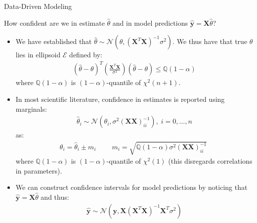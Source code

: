 \documentclass[handout,9pt]{beamer}
\begin{document}
%
\begin{frame}{Data-Driven Modeling}

\begin{block}{}
How confident are we in estimate $\hat{\theta}$ and in model predictions $\hat{\mathbf{y}}=\mathbf{X}\hat{\theta}$?
\end{block}
\begin{itemize}
\setlength{\itemsep}{5pt}
\item We have established that $\hat{\theta}\sim\mathcal{N}(\theta,(\mathbf{X}^T\mathbf{X})^{-1}\sigma^2)$.  We thus have that true $\theta$ lies in ellipsoid $\mathcal{E}$ defined by:
\begin{align*}
(\hat{\theta}-\theta)^T\left(\frac{\mathbf{X}^T\mathbf{X}}{\sigma^2}\right)(\hat{\theta}-\theta)\leq \mathbb{Q}(1-\alpha)
\end{align*}
where $\mathbb{Q}(1-\alpha)$ is $(1-\alpha)$-quantile of $\chi^2(n+1)$.  

\item In most scientific literature, confidence in estimates is reported using marginals:
\begin{align*}
\hat{\theta}_i\sim \mathcal{N}(\theta_i,\sigma^2(\mathbf{X}\mathbf{X})^{-1}_{ii}),\; i=0,...,n
\end{align*}
as:
\begin{align*}
\theta_i=\hat{\theta}_i\pm m_i\;\qquad m_i=\sqrt{\mathbb{Q}(1-\alpha)\sigma^2(\mathbf{X}\mathbf{X})^{-1}_{ii}}\;
\end{align*}
where  $\mathbb{Q}(1-\alpha)$ is $(1-\alpha)$-quantile of $\chi^2(1)$ (this disregards correlations in parameters). 
\item We can construct confidence intervals for model predictions by noticing that $\mathbf{\hat{y}}=\mathbf{X}\hat{\theta}$ and thus:
\begin{align*}
\hat{\mathbf{y}}\sim \mathcal{N}(\mathbf{y},\mathbf{X}(\mathbf{X}^T\mathbf{X})^{-1}\mathbf{X}^T\sigma^2)
\end{align*} 
\end{itemize}
\end{frame}
\end{document}
